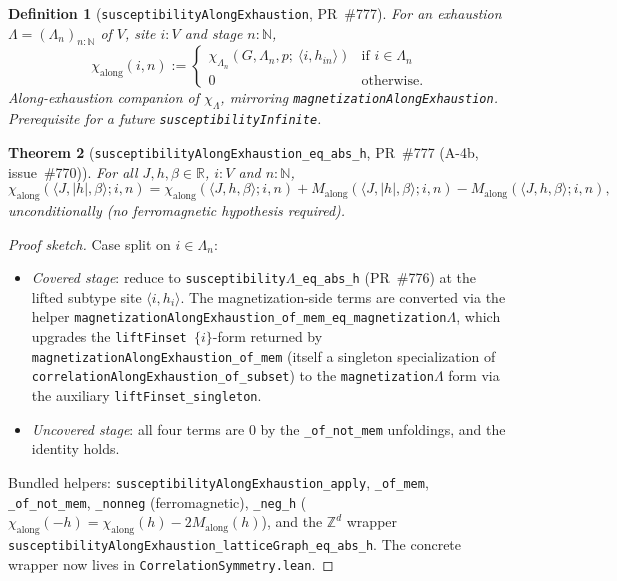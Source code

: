 \documentclass[a4paper,11pt]{article}
\newtheorem{theorem}{Theorem}
\newtheorem{definition}[theorem]{Definition}
\newcommand{\LeanLambda}{\texorpdfstring{\ensuremath{\Lambda}}{Lambda}}
\begin{document}
\begin{definition}[\texttt{susceptibilityAlongExhaustion}, PR~\#777]
For an exhaustion $\Lambda = (\Lambda_n)_{n : \mathbb N}$ of $V$, site $i : V$
and stage $n : \mathbb N$,
\[
  \chi_{\mathrm{along}}(i, n)
  := \begin{cases}
       \chi_{\Lambda_n}(G, \Lambda_n, p;\ \langle i, h_{in}\rangle) & \text{if } i \in \Lambda_n \\
       0 & \text{otherwise.}
     \end{cases}
\]
Along-exhaustion companion of $\chi_\Lambda$, mirroring
\texttt{magnetizationAlongExhaustion}. Prerequisite for a future
\texttt{susceptibilityInfinite}.
\end{definition}

\begin{theorem}[\texttt{susceptibilityAlongExhaustion\_eq\_abs\_h},
PR~\#777 (A-4b, issue~\#770)]
For all $J, h, \beta \in \mathbb R$, $i : V$ and $n : \mathbb N$,
\[
  \chi_{\mathrm{along}}(\langle J, |h|, \beta\rangle; i, n)
  = \chi_{\mathrm{along}}(\langle J, h, \beta\rangle; i, n)
    + M_{\mathrm{along}}(\langle J, |h|, \beta\rangle; i, n) - M_{\mathrm{along}}(\langle J, h, \beta\rangle; i, n),
\]
unconditionally (no ferromagnetic hypothesis required).
\end{theorem}
\begin{proof}[Proof sketch]
Case split on $i \in \Lambda_n$:
\begin{itemize}
  \item \emph{Covered stage}: reduce to
    \texttt{susceptibility\LeanLambda\_eq\_abs\_h} (PR~\#776) at the lifted
    subtype site $\langle i, h_i\rangle$. The magnetization-side
    terms are converted via the helper
    \texttt{magnetizationAlongExhaustion\_of\_mem\_eq\_magnetization\LeanLambda},
    which upgrades the \texttt{liftFinset $\{i\}$}-form returned by
    \texttt{magnetizationAlongExhaustion\_of\_mem} (itself a singleton
    specialization of \texttt{correlationAlongExhaustion\_of\_subset})
    to the \texttt{magnetization\LeanLambda} form via the auxiliary
    \texttt{liftFinset\_singleton}.
  \item \emph{Uncovered stage}: all four terms are $0$ by the
    \texttt{\_of\_not\_mem} unfoldings, and the identity holds.
\end{itemize}
Bundled helpers: \texttt{susceptibilityAlongExhaustion\_apply},
\texttt{\_of\_mem}, \texttt{\_of\_not\_mem}, \texttt{\_nonneg}
(ferromagnetic), \texttt{\_neg\_h}
($\chi_{\mathrm{along}}(-h) = \chi_{\mathrm{along}}(h) - 2 M_{\mathrm{along}}(h)$),
and the $\mathbb Z^d$ wrapper
\texttt{susceptibilityAlongExhaustion\_latticeGraph\_eq\_abs\_h}. The concrete
wrapper now lives in
\texttt{CorrelationSymmetry.lean}.
\end{proof}
\end{document}
